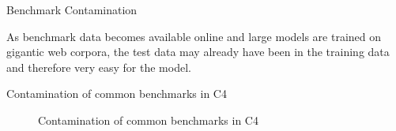 \begin{vbframe}{Benchmark Contamination}

	As benchmark data becomes available online and large models are trained on gigantic web corpora, the test data may already have been in the training data and therefore very easy for the model.

	Contamination of common benchmarks in C4
	\begin{figure}
		\centering
	  
		\hfill
	  
		\caption{Contamination of common benchmarks in C4}
	  \end{figure}

		
\end{vbframe}

